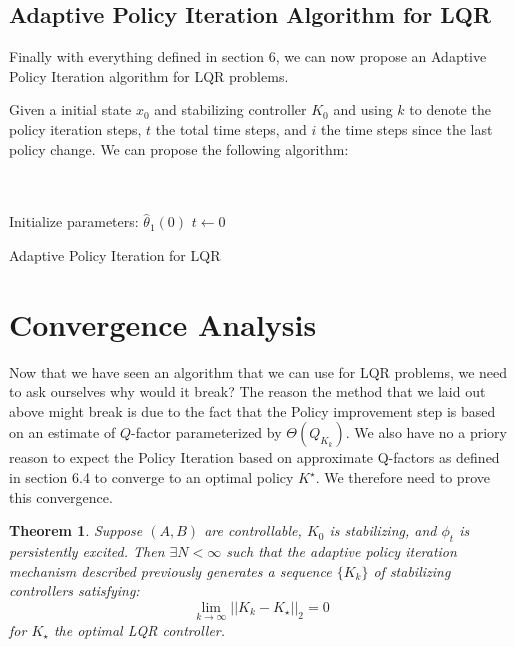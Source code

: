 \documentclass{article}[12pt]
\newtheorem{theorem}{Theorem}
\newcommand{\norm}[1]{\left|\left|#1\right|\right|}
\begin{document}
\subsection{Adaptive Policy Iteration Algorithm for LQR}
Finally with everything defined in section 6, we can now propose an Adaptive Policy Iteration algorithm for LQR problems.

Given a initial state $x_0$ and stabilizing controller $K_0$ and using $k$ to denote the policy iteration steps, $t$ the total time steps, and $i$ the time steps since the last policy change. We can propose the following algorithm: \\
\\
\\
\begin{algorithm}[H]
\SetAlgoLined
 Initialize parameters: $\hat \theta_1(0)$ \;
 $t \gets 0$\;
 \caption{Adaptive Policy Iteration for LQR}
\end{algorithm}

\newpage
\section{Convergence Analysis}
Now that we have seen an algorithm that we can use for LQR problems, we need to ask ourselves why would it break? The reason the method that we laid out above might break is due to the fact that the Policy improvement step is based on an estimate of $Q$-factor parameterized by $\Theta(Q_{K_k})$. We also have no a priory reason to expect the Policy Iteration based on approximate Q-factors as defined in section 6.4 to converge to an optimal policy $K^\star$. We therefore need to prove this convergence.

\begin{theorem}\label{theo:1}
Suppose $(A,B)$ are controllable, $K_0$ is stabilizing, and $\phi_t$ is persistently excited. Then $\exists N < \infty$ such that the adaptive policy iteration mechanism described previously generates a sequence $\{K_k\}$ of stabilizing controllers satisfying:
\begin{equation}\label{eq:19}
\lim_{k\to \infty} \norm{K_k-K_\star}_2=0
\end{equation}
for $K_\star$ the optimal LQR controller.
\end{theorem}
\end{document}
